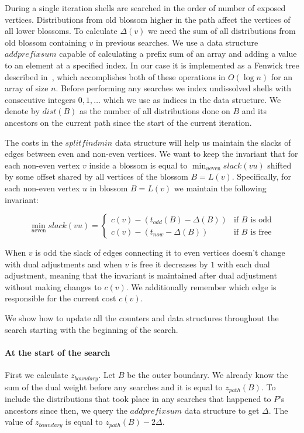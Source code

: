 During a single iteration shells are searched in the order of number of exposed vertices. Distributions from old blossom higher in the path affect the vertices of all lower blossoms. To calculate $\Delta(v)$ we need the sum of all distributions from old blossom containing $v$ in previous searches. We use a data structure $addprefixsum$ capable of calculating a prefix sum of an array and adding a value to an element at a specified index. In our case it is implemented as a Fenwick tree described in~\cite{Fenwick1994AND}, which accomplishes both of these operations in $O(\log n)$ for an array of size $n$. Before performing any searches we index undissolved shells with consecutive integers $0, 1, \dots$ which we use as indices in the data structure. We denote by $dist(B)$ as the number of all distributions done on $B$ and its ancestors on the current path since the start of the current iteration.

The costs in the $splitfindmin$ data structure will help us maintain the slacks of edges between even and non-even vertices. We want to keep the invariant that for each non-even vertex $v$ inside a blossom is equal to $\min_{u \text{even}} slack(vu)$ shifted by some offset shared by all vertices of the blossom $B = L(v)$. Specifically, for each non-even vertex $u$ in blossom $B = L(v)$ we maintain the following invariant:

\[ 
\min_{u \text{even}} slack(vu) = \begin{cases}
    c(v) - (t_{odd}(B) - \Delta(B)) & \text{if $B$ is odd} \\
    c(v) - (t_{now} - \Delta(B)) & \text{if $B$ is free}
\end{cases}
\]

When $v$ is odd the slack of edges connecting it to even vertices doesn't change with dual adjustments and when $v$ is free it decreases by $1$ with each dual adjustment, meaning that the invariant is maintained after dual adjustment without making changes to $c(v)$. We additionally remember which edge is responsible for the current cost $c(v)$.

We show how to update all the counters and data structures throughout the search starting with the beginning of the search. 

\paragraph*{At the start of the search} First we calculate $z_{boundary}$. Let $B$ be the outer boundary. We already know the sum of the dual weight before any searches and it is equal to $z_{path}(B)$. To include the distributions that took place in any searches that happened to $P$'s ancestors since then, we query the $addprefixsum$ data structure to get $\Delta$. The value of $z_{boundary}$ is equal to $z_{path}(B) - 2\Delta$. 

